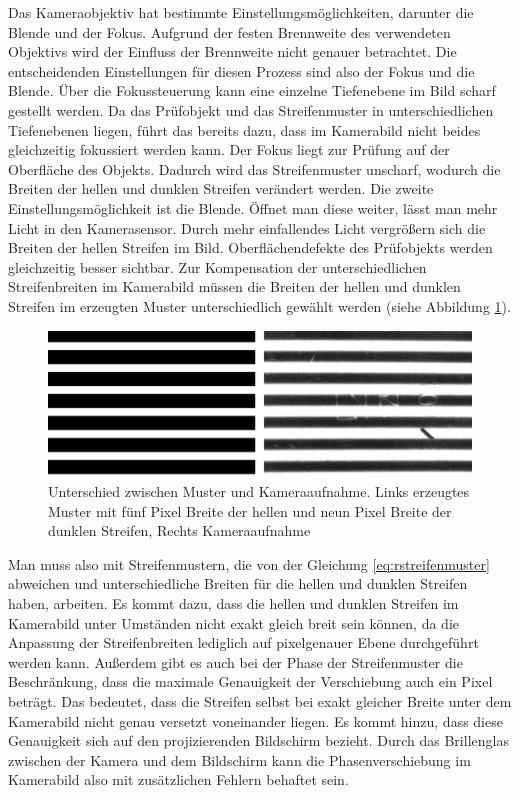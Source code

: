 Das Kameraobjektiv hat bestimmte Einstellungsmöglichkeiten, darunter die Blende und der Fokus.
Aufgrund der festen Brennweite des verwendeten Objektivs wird der Einfluss der Brennweite nicht genauer betrachtet.
Die entscheidenden Einstellungen für diesen Prozess sind also der Fokus und die Blende.
Über die Fokussteuerung kann eine einzelne Tiefenebene im Bild scharf gestellt werden.
Da das Prüfobjekt und das Streifenmuster in unterschiedlichen Tiefenebenen liegen, führt das bereits dazu, dass im Kamerabild nicht beides gleichzeitig fokussiert werden kann.
Der Fokus liegt zur Prüfung auf der Oberfläche des Objekts.
Dadurch wird das Streifenmuster unscharf, wodurch die Breiten der hellen und dunklen Streifen verändert werden.
Die zweite Einstellungsmöglichkeit ist die Blende.
Öffnet man diese weiter, lässt man mehr Licht in den Kamerasensor.
Durch mehr einfallendes Licht vergrößern sich die Breiten der hellen Streifen im Bild. 
Oberflächendefekte des Prüfobjekts werden gleichzeitig besser sichtbar.
Zur Kompensation der unterschiedlichen Streifenbreiten im Kamerabild müssen die Breiten der hellen und dunklen Streifen im erzeugten Muster unterschiedlich gewählt werden (siehe Abbildung \ref{img:differenceCamPat}).

\begin{figure}[H]
	\centering
	\includegraphics[width=\textwidth]{03_sichtpruefungDurchLichtstreuung/optimierungen/unterschiedeKameraUndMonitor/figures/differenceCameraPattern}
	\caption[Unterschied zwischen Muster und Kameraaufnahme]{Unterschied zwischen Muster und Kameraaufnahme. Links erzeugtes Muster mit fünf Pixel Breite der hellen und neun Pixel Breite der dunklen Streifen, Rechts Kameraaufnahme}
	\label{img:differenceCamPat}
\end{figure}

\noindent
Man muss also mit Streifenmustern, die von der Gleichung \ref{eq:rstreifenmuster} abweichen und unterschiedliche Breiten für die hellen und dunklen Streifen haben, arbeiten.
Es kommt dazu, dass die hellen und dunklen Streifen im Kamerabild unter Umständen nicht exakt gleich breit sein können, da die Anpassung der Streifenbreiten lediglich auf pixelgenauer Ebene durchgeführt werden kann.
Außerdem gibt es auch bei der Phase der Streifenmuster die Beschränkung, dass die maximale Genauigkeit der Verschiebung auch ein Pixel beträgt.
Das bedeutet, dass die Streifen selbst bei exakt gleicher Breite unter dem Kamerabild nicht genau versetzt voneinander liegen.
Es kommt hinzu, dass diese Genauigkeit sich auf den projizierenden Bildschirm bezieht.
Durch das Brillenglas zwischen der Kamera und dem Bildschirm kann die Phasenverschiebung im Kamerabild also mit zusätzlichen Fehlern behaftet sein.
